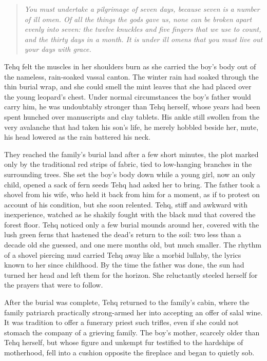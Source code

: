 \begin{quote}
\emph{You must undertake a pilgrimage of seven days, because seven is a number of ill omen. Of all the things the gods gave us, none can be broken apart evenly into seven: the twelve knuckles and five fingers that we use to count, and the thirty days in a month. It is under ill omens that you must live out your days with grace.}
\end{quote}

Tehq felt the muscles in her shoulders burn as she carried the boy's body out of the nameless, rain-soaked vassal canton. The winter rain had soaked through the thin burial wrap, and she could smell the mint leaves that she had placed over the young leopard's chest. Under normal circumstances the boy's father would carry him, he was undoubtably stronger than Tehq herself, whose years had been spent hunched over manuscripts and clay tablets. His ankle still swollen from the very avalanche that had taken his son's life, he merely hobbled beside her, mute, his head lowered as the rain battered his neck.

They reached the family's burial land after a few short minutes, the plot marked only by the traditional red strips of fabric, tied to low-hanging branches in the surrounding trees. She set the boy's body down while a young girl, now an only child, opened a sack of fern seeds Tehq had asked her to bring. The father took a shovel from his wife, who held it back from him for a moment, as if to protest on account of his condition, but she soon relented. Tehq, stiff and awkward with inexperience, watched as he shakily fought with the black mud that covered the forest floor. Tehq noticed only a few burial mounds around her, covered with the lush green ferns that hastened the dead's return to the soil: two less than a decade old she guessed, and one mere months old, but much smaller. The rhythm of a shovel piercing mud carried Tehq away like a morbid lullaby, the lyrics known to her since childhood. By the time the father was done, the sun had turned her head and left them for the horizon. She reluctantly steeled herself for the prayers that were to follow.

After the burial was complete, Tehq returned to the family's cabin, where the family patriarch practically strong-armed her into accepting an offer of salal wine. It was tradition to offer a funerary priest such trifles, even if she could not stomach the company of a grieving family. The boy's mother, scarcely older than Tehq herself, but whose figure and unkempt fur testified to the hardships of motherhood, fell into a cushion opposite the fireplace and began to quietly sob.

